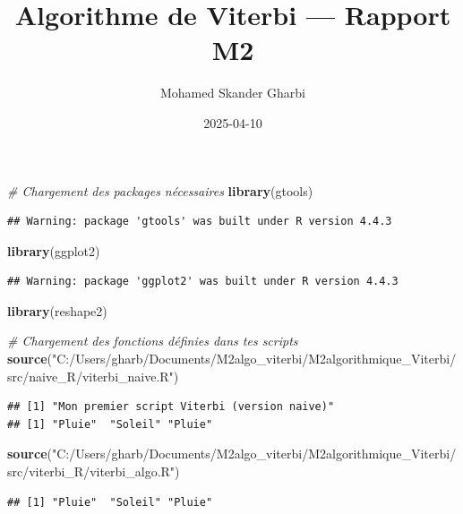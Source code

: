 \documentclass[
]{article}
\title{Algorithme de Viterbi --- Rapport M2}
\author{Mohamed Skander Gharbi}
\date{2025-04-10}
\newenvironment{Shaded}{\begin{snugshade}}{\end{snugshade}}
\newcommand{\CommentTok}[1]{\textcolor[rgb]{0.56,0.35,0.01}{\textit{#1}}}
\newcommand{\FunctionTok}[1]{\textcolor[rgb]{0.13,0.29,0.53}{\textbf{#1}}}
\newcommand{\NormalTok}[1]{#1}
\newcommand{\StringTok}[1]{\textcolor[rgb]{0.31,0.60,0.02}{#1}}
\begin{document}
\maketitle

\begin{Shaded}
\begin{Highlighting}[]
\CommentTok{\# Chargement des packages nécessaires}
\FunctionTok{library}\NormalTok{(gtools)}
\end{Highlighting}
\end{Shaded}

\begin{verbatim}
## Warning: package 'gtools' was built under R version 4.4.3
\end{verbatim}

\begin{Shaded}
\begin{Highlighting}[]
\FunctionTok{library}\NormalTok{(ggplot2)}
\end{Highlighting}
\end{Shaded}

\begin{verbatim}
## Warning: package 'ggplot2' was built under R version 4.4.3
\end{verbatim}

\begin{Shaded}
\begin{Highlighting}[]
\FunctionTok{library}\NormalTok{(reshape2)}

\CommentTok{\# Chargement des fonctions définies dans tes scripts}
\FunctionTok{source}\NormalTok{(}\StringTok{"C:/Users/gharb/Documents/M2algo\_viterbi/M2algorithmique\_Viterbi/src/naive\_R/viterbi\_naive.R"}\NormalTok{)}
\end{Highlighting}
\end{Shaded}

\begin{verbatim}
## [1] "Mon premier script Viterbi (version naive)"
## [1] "Pluie"  "Soleil" "Pluie"
\end{verbatim}

\begin{Shaded}
\begin{Highlighting}[]
\FunctionTok{source}\NormalTok{(}\StringTok{"C:/Users/gharb/Documents/M2algo\_viterbi/M2algorithmique\_Viterbi/src/viterbi\_R/viterbi\_algo.R"}\NormalTok{)}
\end{Highlighting}
\end{Shaded}

\begin{verbatim}
## [1] "Pluie"  "Soleil" "Pluie"
\end{verbatim}
\end{document}
